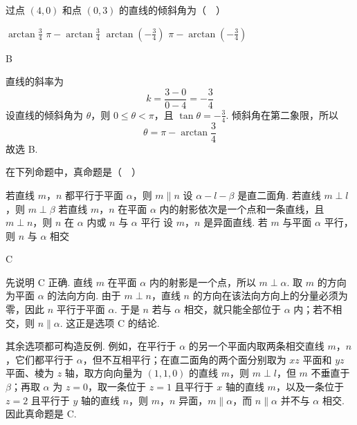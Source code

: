\begin{problem}
过点 \((4,0)\) 和点 \((0,3)\) 的直线的倾斜角为（\(\quad\)）

\choices
    {\(\arctan \frac{3}{4}\)}
    {\(\pi-\arctan \frac{3}{4}\)}
    {\(\arctan\left(-\frac{3}{4}\right)\)}
    {\(\pi-\arctan\left(-\frac{3}{4}\right)\)}
\end{problem}

\begin{answer}
B
\end{answer}

\begin{solution}
直线的斜率为
\[
k=\frac{3-0}{0-4}=-\frac{3}{4}
\]
设直线的倾斜角为 \(\theta\)，则 \(0\leq\theta<\pi\)，且 \(\tan\theta=-\frac{3}{4}\). 倾斜角在第二象限，所以
\[
\theta=\pi-\arctan\frac{3}{4}
\]
故选 B.
\end{solution}

\begin{problem}
在下列命题中，真命题是（\(\quad\)）

\choices
    {若直线 \(m\)，\(n\) 都平行于平面 \(\alpha\)，则 \(m\parallel n\)}
    {设 \(\alpha-l-\beta\) 是直二面角. 若直线 \(m\perp l\)，则 \(m\perp\beta\)}
    {若直线 \(m\)，\(n\) 在平面 \(\alpha\) 内的射影依次是一个点和一条直线，且 \(m\perp n\)，则 \(n\) 在 \(\alpha\) 内或 \(n\) 与 \(\alpha\) 平行}
    {设 \(m\)，\(n\) 是异面直线. 若 \(m\) 与平面 \(\alpha\) 平行，则 \(n\) 与 \(\alpha\) 相交}
\end{problem}

\begin{answer}
C
\end{answer}

\begin{solution}
先说明 C 正确. 直线 \(m\) 在平面 \(\alpha\) 内的射影是一个点，所以 \(m\perp\alpha\). 取 \(m\) 的方向为平面 \(\alpha\) 的法向方向. 由于 \(m\perp n\)，直线 \(n\) 的方向在该法向方向上的分量必须为零，因此 \(n\) 平行于平面 \(\alpha\). 于是 \(n\) 若与 \(\alpha\) 相交，就只能全部位于 \(\alpha\) 内；若不相交，则 \(n\parallel\alpha\). 这正是选项 C 的结论.

其余选项都可构造反例. 例如，在平行于 \(\alpha\) 的另一个平面内取两条相交直线 \(m\)，\(n\)，它们都平行于 \(\alpha\)，但不互相平行；在直二面角的两个面分别取为 \(xz\) 平面和 \(yz\) 平面、棱为 \(z\) 轴，取方向向量为 \((1,1,0)\) 的直线 \(m\)，则 \(m\perp l\)，但 \(m\) 不垂直于 \(\beta\)；再取 \(\alpha\) 为 \(z=0\)，取一条位于 \(z=1\) 且平行于 \(x\) 轴的直线 \(m\)，以及一条位于 \(z=2\) 且平行于 \(y\) 轴的直线 \(n\)，则 \(m\)，\(n\) 异面，\(m\parallel\alpha\)，而 \(n\parallel\alpha\) 并不与 \(\alpha\) 相交. 因此真命题是 C.
\end{solution}

